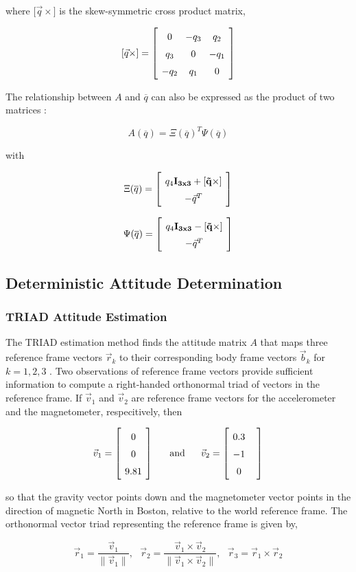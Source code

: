 \documentclass{article}
\newcommand{\mat}[2][ccccccccccccccccccccccccccccccccccccccccccccc]{\left[
        \arraycolsep=4pt\def\arraystretch{1.5}
        \begin{array}{#1} #2 \\ 
        \end{array} 
        \right]}
\newcommand{\tab}{ \textrm{ \ \ \ \ } }
\begin{document}
\begin{flushleft}
where ${[\vec{q}\times}]$ is the skew-symmetric cross product matrix, 

\[ [\vec{q}\times] = \mat{ 0 & -q_3 & q_2 \\ q_3 & 0 & -q_1 \\ -q_2 & q_1 & 0} \]

The relationship between $A$ and $\overline{q}$ can also be expressed as the product of two matrices \cite{Markley2007}: 

\[ A(\overline{q}) = \Xi(\overline{q})^{T} \Psi(\overline{q}) \]

with 

\[ \Xi(\overline{q}) = \mat{q_4 \bf{I}_{3x3} + [\vec{q}\times] \\ -\vec{q}^T } \]

\[ \Psi(\overline{q}) = \mat{q_4 \bf{I}_{3x3} - [\vec{q}\times] \\ -\vec{q}^T } \]

\subsection{Deterministic Attitude Determination}

\subsubsection{TRIAD Attitude Estimation}

The TRIAD estimation method finds the attitude matrix $A$ that maps three reference frame vectors $\vec{r}_k$ to their corresponding body frame vectors $\vec{b}_k$ for $k = 1, 2, 3$ \cite{Shuster2004}. Two observations of reference frame vectors provide sufficient information to compute a right-handed orthonormal triad of vectors in the reference frame. If $\vec{v}_1$ and $\vec{v}_2$ are reference frame vectors for the accelerometer and the magnetometer, respecitively, then 

$$ \vec{v}_1 = \mat{ 0 \\ 0 \\ 9.81 } \tab \textrm{and} \tab \vec{v}_2 = \mat{ 0.3 & \\ -1 & \\ 0 } $$ 

so that the gravity vector points down and the magnetometer vector points in the direction of magnetic North in Boston, relative to the world reference frame. The orthonormal vector triad representing the reference frame is given by, 

$$ \vec{r}_1 = \frac{\vec{v}_1}{\| \vec{v}_1 \|}, \tab \vec{r}_2 = \frac{\vec{v}_1 \times \vec{v}_2}{\| \vec{v}_1 \times \vec{v}_2 \|}, \tab \vec{r}_3 = \vec{r}_1 \times \vec{r}_2 $$


\end{flushleft}
\end{document}

